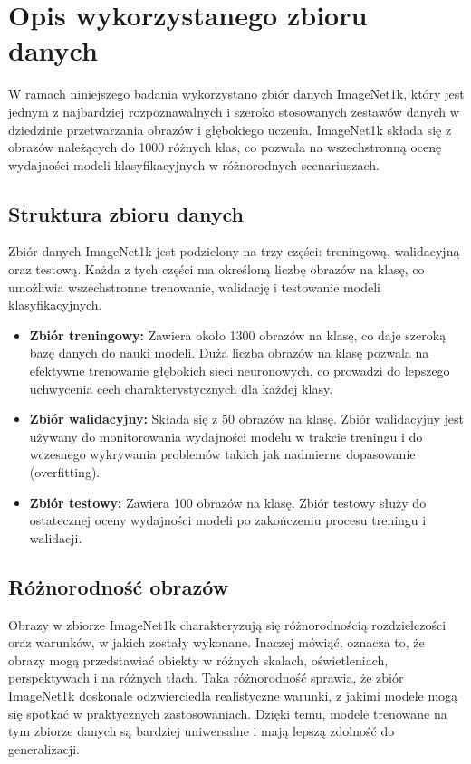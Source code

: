 \section*{Opis wykorzystanego zbioru danych}

W ramach niniejszego badania wykorzystano zbiór danych ImageNet1k, który jest jednym z najbardziej rozpoznawalnych i szeroko stosowanych zestawów danych w dziedzinie przetwarzania obrazów i głębokiego uczenia. ImageNet1k składa się z 
obrazów należących do 1000 różnych klas, co pozwala na wszechstronną ocenę wydajności modeli klasyfikacyjnych w różnorodnych scenariuszach.

\subsection*{Struktura zbioru danych}

Zbiór danych ImageNet1k jest podzielony na trzy części: treningową, walidacyjną oraz testową. Każda z tych części ma określoną liczbę obrazów na klasę, co umożliwia wszechstronne trenowanie, walidację i testowanie modeli klasyfikacyjnych.

\begin{itemize}
    \item \textbf{Zbiór treningowy:} Zawiera około 1300 obrazów na klasę, co daje szeroką bazę danych do nauki modeli. 
    Duża liczba obrazów na klasę pozwala na efektywne trenowanie głębokich sieci neuronowych, co prowadzi do lepszego 
    uchwycenia cech charakterystycznych dla każdej klasy.
    \item \textbf{Zbiór walidacyjny:} Składa się z 50 obrazów na klasę. Zbiór walidacyjny jest używany do monitorowania 
    wydajności modelu w trakcie treningu i do wczesnego wykrywania problemów takich jak nadmierne dopasowanie 
    (overfitting).
    \item \textbf{Zbiór testowy:} Zawiera 100 obrazów na klasę. Zbiór testowy służy do ostatecznej oceny wydajności 
    modeli po zakończeniu procesu treningu i walidacji.
\end{itemize}

\subsection*{Różnorodność obrazów}

Obrazy w zbiorze ImageNet1k charakteryzują się różnorodnością rozdzielczości oraz warunków, w jakich zostały wykonane. Inaczej mówiąć, oznacza to, że obrazy mogą przedstawiać obiekty w różnych skalach, oświetleniach, perspektywach i na 
różnych tłach. Taka różnorodność sprawia, że zbiór ImageNet1k doskonale odzwierciedla realistyczne warunki, z jakimi modele mogą się spotkać w praktycznych zastosowaniach. Dzięki temu, modele trenowane na tym zbiorze danych są bardziej 
uniwersalne i mają lepszą zdolność do generalizacji. 


